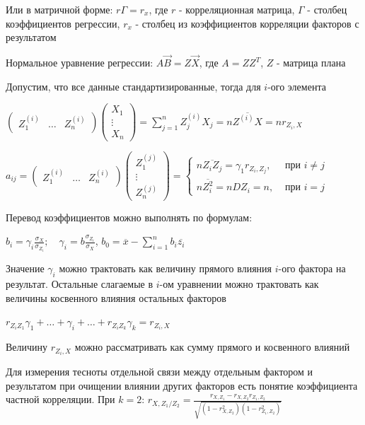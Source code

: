 \documentclass[12pt]{article}
\begin{document}
\begin{enumerate}
    \smallvspace

    Или в матричной форме: $r \Gamma = r_x$, где $r$ - корреляционная матрица, $\Gamma$ - столбец коэффициентов регрессии, $r_x$ - столбец из коэффициентов корреляции факторов с результатом

    Нормальное уравнение регрессии: $A \vec B = Z \vec X$, где $A = Z Z^T$, $Z$ - матрица плана

    Допустим, что все данные стандартизированные, тогда для $i$-ого элемента

    $\begin{pmatrix}Z_1^{(i)} & \dots & Z_n^{(i)}\end{pmatrix} \begin{pmatrix}X_1 \\ \vdots \\ X_n\end{pmatrix} = 
    \sum_{j = 1}^n Z^{(i)}_j X_j = n \overline{Z^{(i)} X} = n r_{Z_i, X}$

    $a_{ij} = \begin{pmatrix}Z_1^{(i)} & \dots & Z_n^{(i)}\end{pmatrix} \begin{pmatrix}Z_1^{(j)} \\ \vdots \\ Z_n^{(j)}\end{pmatrix} = 
    \begin{cases}
        n \overline{Z_i Z_j} = \gamma_1 r_{Z_i, Z_j}, & \text{ при } i \neq j \\
        n \overline{Z_i^2} = n D Z_i = n, & \text{ при } i = j
    \end{cases}$

    Перевод коэффициентов можно выполнять по формулам:

    $b_i = \gamma_i \frac{\sigma_X}{\sigma_{Z_i}}; \quad \gamma_i = b \frac{\sigma_{Z_i}}{\sigma_X}$, $b_0 = \overline{x} - \sum_{i = 1}^n b_i \overline{z_i}$

    Значение $\gamma_i$ можно трактовать как величину прямого влияния $i$-ого фактора на результат. Остальные слагаемые в $i$-ом уравнении можно трактовать
    как величины косвенного влияния остальных факторов 

    $r_{Z_i Z_1} \gamma_1 + \dots + \gamma_i + \dots + r_{Z_i Z_k} \gamma_k = r_{Z_i, X}$

    Величину $r_{Z_i, X}$ можно рассматривать как сумму прямого и косвенного влияний

    \Nota Для измерения тесноты отдельной связи между отдельным фактором и результатом при очищении влиянии других факторов
    есть понятие коэффициента частной корреляции. При $k = 2$: $r_{X, Z_1 / Z_2} = \frac{r_{X, Z_1} - r_{X, Z_2} r_{Z_1, Z_2}}{\sqrt{(1 - r_{X, Z_2}^2)(1 - r_{Z_1, Z_2}^2)}}$


\end{enumerate}
\end{document}
